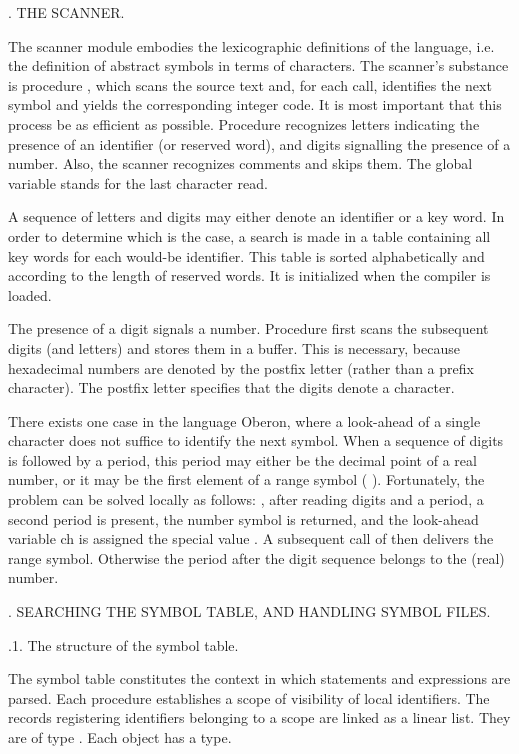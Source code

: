 . THE SCANNER.

The scanner module  embodies the lexicographic definitions of the language, i.e. the definition of abstract symbols in terms of characters. The scanner's substance is procedure , which scans the source text and, for each call, identifies the next symbol and yields the corresponding integer code. It is most important that this process be as efficient as possible. Procedure  recognizes letters indicating the presence of an identifier (or reserved word), and digits signalling the presence of a number. Also, the scanner recognizes comments and skips them. The global variable  stands for the last character read.

A sequence of letters and digits may either denote an identifier or a key word. In order to determine which is the case, a search is made in a table containing all key words for each would-be identifier. This table is sorted alphabetically and according to the length of reserved words. It is initialized when the compiler is loaded.

The presence of a digit signals a number. Procedure  first scans the subsequent digits (and letters) and stores them in a buffer. This is necessary, because hexadecimal numbers are denoted by the postfix letter  (rather than a prefix character). The postfix letter  specifies that the digits denote a character.

There exists one case in the language Oberon, where a look-ahead of a single character does not suffice to identify the next symbol. When a sequence of digits is followed by a period, this period may either be the decimal point of a real number, or it may be the first element of a range symbol (  ). Fortunately, the problem can be solved locally as follows: , after reading digits and a period, a second period is present, the number symbol is returned, and the look-ahead variable ch is assigned the special value . A subsequent call of  then delivers the range symbol. Otherwise the period after the digit sequence belongs to the (real) number.

. SEARCHING THE SYMBOL TABLE, AND HANDLING SYMBOL FILES.

.1. The structure of the symbol table.

The symbol table constitutes the context in which statements and expressions are parsed. Each procedure establishes a scope of visibility of local identifiers. The records registering identifiers belonging to a scope are linked as a linear list. They are of type . Each object has a type.


